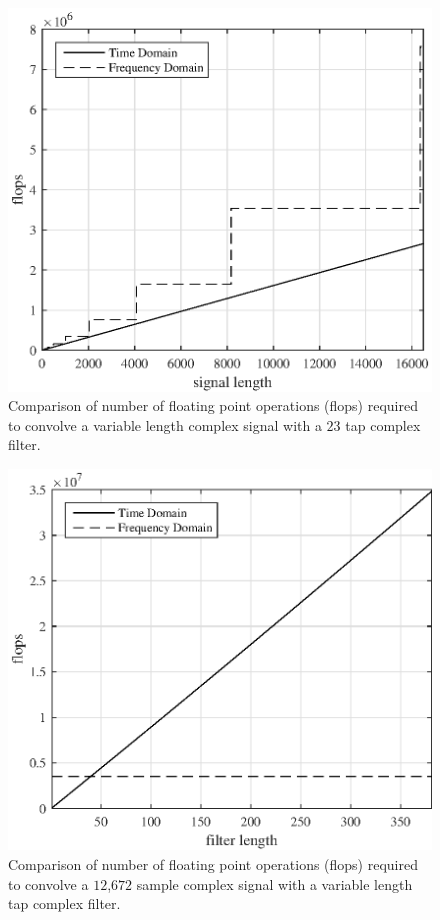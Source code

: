 \begin{figure}
	\centering\includegraphics[width=5in]{figures/gpu_intro/Theory23Tap_flops.eps}
	\caption{Comparison of number of floating point operations (flops) required to convolve a variable length complex signal with a $23$ tap complex filter.}
	\label{fig:Theory23Tap_flops}
\end{figure}
\begin{figure} 
	\centering\includegraphics[width=5in]{figures/gpu_intro/Theory12672signal_flops.eps}
	\caption{Comparison of number of floating point operations (flops) required to convolve a $12$,$672$ sample complex signal with a variable length tap complex filter.}
	\label{fig:Theory12672signal_flops}
\end{figure}

